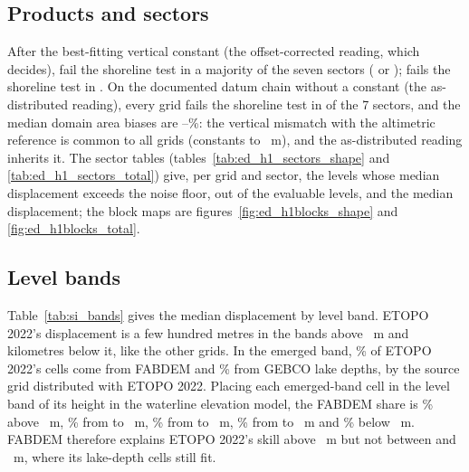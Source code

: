 
\subsection*{Products and sectors}
After the best-fitting vertical constant (the offset-corrected reading, which decides),  fail the shoreline test in a majority of the seven sectors ( or );  fails the shoreline test in . On the documented datum chain without a constant (the as-distributed reading), every grid fails the shoreline test in  of the 7 sectors, and the median domain area biases are --\%: the vertical mismatch with the altimetric reference is common to all grids (constants  to ~m), and the as-distributed reading inherits it. The sector tables (tables~\ref{tab:ed_h1_sectors_shape} and \ref{tab:ed_h1_sectors_total}) give, per grid and sector, the levels whose median displacement exceeds the noise floor, out of the evaluable levels, and the median displacement; the block maps are figures~\ref{fig:ed_h1blocks_shape} and \ref{fig:ed_h1blocks_total}.

\subsection*{Level bands}
Table~\ref{tab:si_bands} gives the median displacement by level band. ETOPO 2022's displacement is a few hundred metres in the bands above ~m and kilometres below it, like the other grids. In the emerged band, \% of ETOPO 2022's cells come from FABDEM and \% from GEBCO lake depths, by the source grid distributed with ETOPO 2022\citep{macferrin2025}. Placing each emerged-band cell in the level band of its height in the waterline elevation model, the FABDEM share is \% above ~m, \% from  to ~m, \% from  to ~m, \% from  to ~m and \% below ~m. FABDEM therefore explains ETOPO 2022's skill above ~m but not between  and ~m, where its lake-depth cells still fit.

